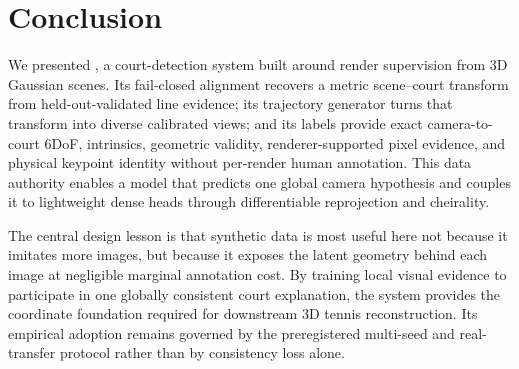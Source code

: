 \section{Conclusion}
\label{sec:conclusion}

We presented \Method, a court-detection system built around render supervision
from 3D Gaussian scenes.  Its fail-closed alignment recovers a metric
scene--court transform from held-out-validated line evidence; its trajectory
generator turns that transform into diverse calibrated views; and its labels
provide exact camera-to-court 6DoF, intrinsics, geometric validity,
renderer-supported pixel evidence, and physical keypoint identity without
per-render human annotation.  This data authority
enables a model that predicts one global camera hypothesis and couples it to
lightweight dense heads through differentiable reprojection and cheirality.

The central design lesson is that synthetic data is most useful here not because
it imitates more images, but because it exposes the latent geometry behind each
image at negligible marginal annotation cost.  By training local visual
evidence to participate in one globally consistent court explanation, the
system provides the coordinate foundation required for downstream 3D tennis
reconstruction.  Its empirical adoption remains governed by the preregistered
multi-seed and real-transfer protocol rather than by consistency loss alone.
